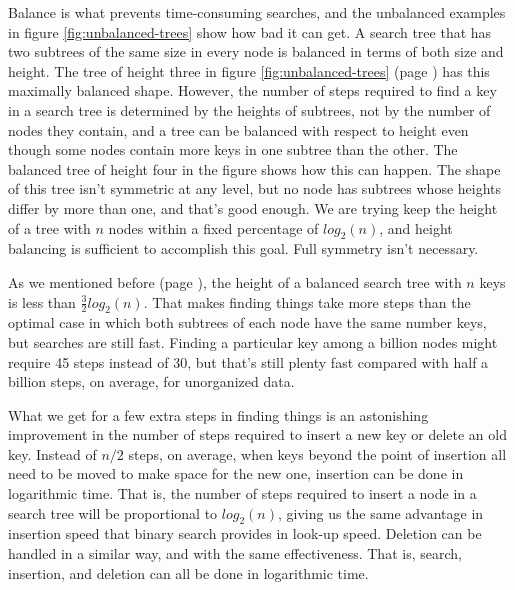 Balance is what prevents time-consuming searches, and the unbalanced
examples in figure \ref{fig:unbalanced-trees} show how bad it can get.
A search tree that has two subtrees of the same size in every node
is balanced in terms of both size and height. The tree of height three
in figure \ref{fig:unbalanced-trees} (page \pageref{fig:unbalanced-trees})
has this maximally balanced shape.
However, the number of steps
required to find a key in a search tree is determined by the heights of subtrees,
not by the number of nodes they contain, and
a tree can be balanced with respect to height even though some nodes contain
more keys in one subtree than the other.
The balanced tree of height four in the figure shows how this can happen.
The shape of this tree isn't symmetric at any level,
but no node has subtrees whose heights differ by more than one,
and that's good enough.
We are trying keep the height of a tree with $n$ nodes
within a fixed percentage of $log_2(n)$,
and height balancing is sufficient to accomplish this goal.
Full symmetry isn't necessary. %

As we mentioned before (page \pageref{50pct-thm}),
the height of a balanced search tree with $n$ keys
is less than $\frac{3}{2} log_2(n)$.
That makes finding things take more
steps than the optimal case in which both subtrees of
each node have the same number keys,
but searches are still fast.
Finding a particular key among a billion nodes
might require 45 steps instead of 30, but that's %
still plenty fast compared with half a billion steps,
on average, for unorganized data.

What we get for a few extra steps in finding things is
an astonishing improvement in the number of steps required
to insert a new key or delete an old key.
Instead of $n/2$ steps, on average,
when keys beyond the point of insertion
all need to be moved to make space for the new one,
insertion can be done in logarithmic time.
That is, the number of steps required to insert
a node in a search tree will be proportional to $log_2(n)$,
giving us the same advantage in insertion speed
that binary search provides in look-up speed.
Deletion can be handled in a similar way, and with the same effectiveness.
That is, search, insertion, and deletion can all be done in logarithmic time.

\begin{exercises}
\end{exercises}

